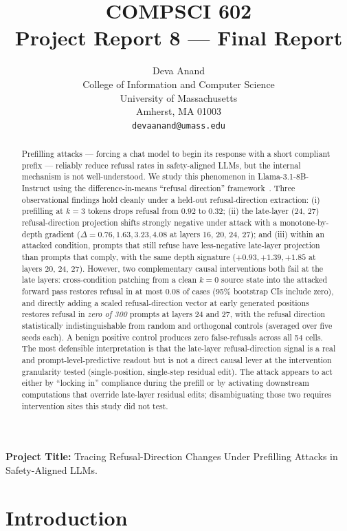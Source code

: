 \documentclass{article}
\title{COMPSCI 602 \\ Project Report 8 --- Final Report}
\author{%
  Deva Anand\\
  College of Information and Computer Science\\
  University of Massachusetts\\
  Amherst, MA 01003 \\
  \texttt{devaanand@umass.edu} \\
}
\begin{document}
\maketitle

\textbf{Project Title:} Tracing Refusal-Direction Changes Under Prefilling
Attacks in Safety-Aligned LLMs.

\begin{abstract}
Prefilling attacks --- forcing a chat model to begin its response with a
short compliant prefix --- reliably reduce refusal rates in safety-aligned
LLMs, but the internal mechanism is not well-understood. We study this
phenomenon in Llama-3.1-8B-Instruct using the difference-in-means
``refusal direction'' framework~\cite{arditi2024refusal}. Three
observational findings hold cleanly under a held-out refusal-direction
extraction: (i) prefilling at $k=3$ tokens drops refusal from $0.92$ to
$0.32$; (ii) the late-layer (24, 27) refusal-direction projection shifts
strongly negative under attack with a monotone-by-depth gradient
($\Delta=0.76, 1.63, 3.23, 4.08$ at layers 16, 20, 24, 27); and
(iii) within an attacked condition, prompts that still refuse have
less-negative late-layer projection than prompts that comply, with the
same depth signature ($+0.93, +1.39, +1.85$ at layers 20, 24, 27).
However, two complementary causal interventions both fail at the late
layers: cross-condition patching from a clean $k=0$ source state into the
attacked forward pass restores refusal in at most $0.08$ of cases (95\%
bootstrap CIs include zero), and directly adding a scaled refusal-direction
vector at early generated positions restores refusal in \emph{zero of 300}
prompts at layers 24 and 27, with the refusal direction statistically
indistinguishable from random and orthogonal controls (averaged over five
seeds each). A benign positive control produces zero false-refusals across
all 54 cells. The most defensible interpretation is that the late-layer
refusal-direction signal is a real and prompt-level-predictive readout but
is not a direct causal lever at the intervention granularity tested
(single-position, single-step residual edit). The attack appears to act
either by ``locking in'' compliance during the prefill or by activating
downstream computations that override late-layer residual edits;
disambiguating those two requires intervention sites this study did not
test.
\end{abstract}

\section{Introduction}
\label{sec:intro}
\end{document}
